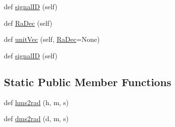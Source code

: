 \begin{DoxyCompactItemize}
\item 
def \hyperlink{classmodest_1_1signals_1_1signalsource_1_1SignalSource_a9a64c6a9c2954f6ad61e4ca3518ea8ab}{signal\+ID} (self)
\item 
def \hyperlink{classmodest_1_1signals_1_1pointsource_1_1PointSource_a295eb1a487e18c77029585ac2785db80}{Ra\+Dec} (self)
\item 
def \hyperlink{classmodest_1_1signals_1_1pointsource_1_1PointSource_a133933430a784107258901e257778221}{unit\+Vec} (self, \hyperlink{classmodest_1_1signals_1_1pointsource_1_1PointSource_a295eb1a487e18c77029585ac2785db80}{Ra\+Dec}=None)
\item 
def \hyperlink{classmodest_1_1signals_1_1signalsource_1_1SignalSource_a9a64c6a9c2954f6ad61e4ca3518ea8ab}{signal\+ID} (self)
\end{DoxyCompactItemize}
\subsection*{Static Public Member Functions}
\begin{DoxyCompactItemize}
\item 
def \hyperlink{classmodest_1_1signals_1_1xraysource_1_1PeriodicXRaySource_ae9e07e0f728014ba3b6af0022d6367fe}{hms2rad} (h, m, s)
\item 
def \hyperlink{classmodest_1_1signals_1_1xraysource_1_1PeriodicXRaySource_a117b7c3ff21b26887d74fce01ffad0a8}{dms2rad} (d, m, s)
\end{DoxyCompactItemize}
